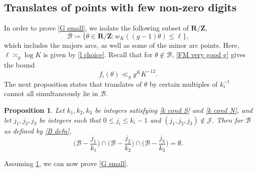 \documentclass[hidelinks,11pt,reqno]{amsart}
\renewcommand{\leq}{\leqslant}
\newcommand{\Z}{\ensuremath{\mathbf{Z}}}
\newcommand{\R}{\ensuremath{\mathbf{R}}}
\newcommand{\st}{\ensuremath{:}}
\newcommand{\fewnz}{\mathcal{B}}
\newtheorem{prop}{Proposition}[section]
\theoremstyle{remark}
\begin{document}
\subsection{Translates of points with few non-zero digits}
In order to prove \cref{G small}, we isolate the following subset of $\R/\Z$, \begin{equation}\label{B defn}
    \fewnz\coloneq\{\theta \in \R/\Z \st w_{K}((g-1)\theta)\leq \ell\},
\end{equation} which includes the majors arcs, as well as some of the minor arc points. Here, $\ell\asymp_{g} \log K$ is given by \cref{l choice}. Recall that for $\theta\notin \fewnz$, \cref{FM very good g} gives the bound
\[f_{i}(\theta)\ll_{g} g^{K}K^{-12}.\]
The next proposition states that translates of $\theta$ by certain multiples of $k_{i}^{-1}$ cannot all simultaneously lie in $\mathcal{B}$. 
\begin{prop}\label{translate bad arcs overlap}
    Let $k_{1},k_{2},k_{3}$ be integers satisfying \cref{k cond S} and \cref{k cond N}, and let $j_{1},j_{2},j_{3}$ be integers such that $0\leq j_{i}\leq k_{i}-1$ and $(j_{1},j_{2},j_{3})\notin \mathcal{J}$. Then for $\mathcal{B}$ as defined by \cref{B defn},
    \[\Big (\fewnz -\frac{j_{1}}{k_{1}}\Big )\cap \Big (\fewnz -\frac{j_{2}}{k_{2}}\Big )\cap \Big (\fewnz -\frac{j_{3}}{k_{3}}\Big )=\emptyset.\]
\end{prop}
Assuming \cref{translate bad arcs overlap}, we can now prove \cref{G small}.
\end{document}
